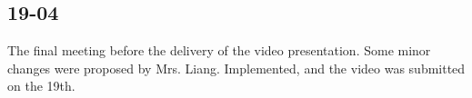 \documentclass[a4paper,11pt,oneside]{book}
\begin{document}
	\subsection{19-04}
	The final meeting before the delivery of the video presentation. Some minor changes were proposed by Mrs. Liang. Implemented, and the video was submitted on the 19th.
	
	
	
	
\end{document}
